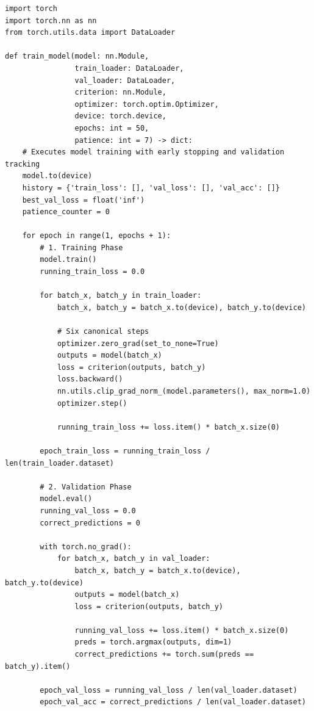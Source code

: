 \begin{lstlisting}[style=pythonstyle, caption={Complete production-grade PyTorch training and validation loop.}, label={lst:full_training_loop}]
import torch
import torch.nn as nn
from torch.utils.data import DataLoader

def train_model(model: nn.Module, 
                train_loader: DataLoader, 
                val_loader: DataLoader, 
                criterion: nn.Module, 
                optimizer: torch.optim.Optimizer, 
                device: torch.device, 
                epochs: int = 50, 
                patience: int = 7) -> dict:
    # Executes model training with early stopping and validation tracking
    model.to(device)
    history = {'train_loss': [], 'val_loss': [], 'val_acc': []}
    best_val_loss = float('inf')
    patience_counter = 0

    for epoch in range(1, epochs + 1):
        # 1. Training Phase
        model.train()
        running_train_loss = 0.0

        for batch_x, batch_y in train_loader:
            batch_x, batch_y = batch_x.to(device), batch_y.to(device)

            # Six canonical steps
            optimizer.zero_grad(set_to_none=True)
            outputs = model(batch_x)
            loss = criterion(outputs, batch_y)
            loss.backward()
            nn.utils.clip_grad_norm_(model.parameters(), max_norm=1.0)
            optimizer.step()

            running_train_loss += loss.item() * batch_x.size(0)

        epoch_train_loss = running_train_loss / len(train_loader.dataset)

        # 2. Validation Phase
        model.eval()
        running_val_loss = 0.0
        correct_predictions = 0

        with torch.no_grad():
            for batch_x, batch_y in val_loader:
                batch_x, batch_y = batch_x.to(device), batch_y.to(device)
                outputs = model(batch_x)
                loss = criterion(outputs, batch_y)

                running_val_loss += loss.item() * batch_x.size(0)
                preds = torch.argmax(outputs, dim=1)
                correct_predictions += torch.sum(preds == batch_y).item()

        epoch_val_loss = running_val_loss / len(val_loader.dataset)
        epoch_val_acc = correct_predictions / len(val_loader.dataset)


\end{lstlisting}
